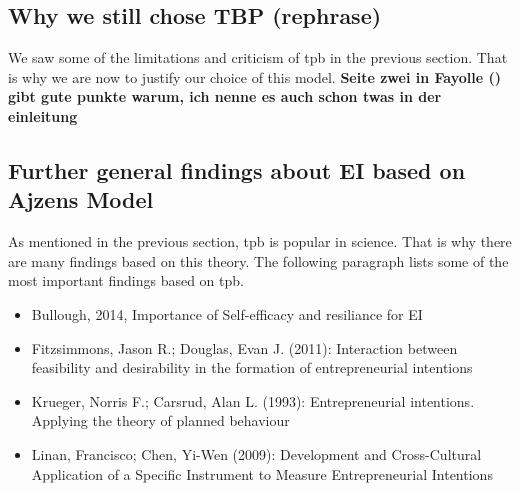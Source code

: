 \subsection{Why we still chose TBP (rephrase)}
We saw some of the limitations and criticism of \ac{tpb} in the previous section. That is why we are now to justify our choice of this model.
\textbf{Seite zwei in Fayolle (\cite{fayolle2015impact}) gibt gute punkte warum, ich nenne es auch schon twas in der einleitung}

\subsection{Further general findings about EI based on Ajzens Model}
As mentioned in the previous section, \ac{tpb} is popular in science. That is why there are many findings based on this theory. The following paragraph lists some of the most important findings based on \ac{tpb}.
\begin{itemize}
\item Bullough, 2014, Importance of Self-efficacy and resiliance for EI
\item Fitzsimmons, Jason R.; Douglas, Evan J. (2011): Interaction between feasibility and desirability in the formation of entrepreneurial intentions
\item Krueger, Norris F.; Carsrud, Alan L. (1993): Entrepreneurial intentions. Applying the theory of planned behaviour
\item Linan, Francisco; Chen, Yi-Wen (2009): Development and Cross-Cultural Application of a Specific Instrument to Measure Entrepreneurial Intentions
\end{itemize}